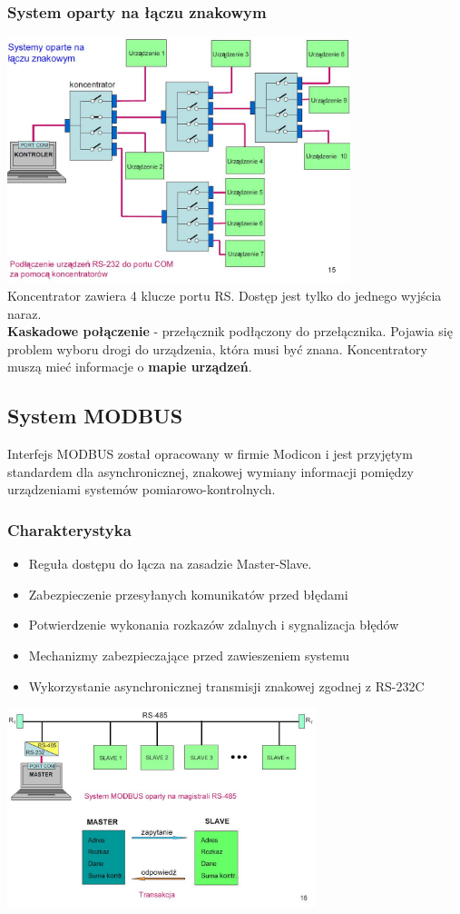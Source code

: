 		\subsubsection{System oparty na łączu znakowym}
		\includegraphics[width=10cm]{./wyklady/RS232_15_1.jpg}\\
		Koncentrator zawiera 4 klucze portu RS. Dostęp jest tylko do jednego wyjścia naraz.\\
		\textbf{Kaskadowe połączenie} - przełącznik podłączony do przełącznika. Pojawia się problem wyboru drogi do urządzenia, która musi być znana. Koncentratory muszą mieć informacje o \textbf{mapie urządzeń}.
	\subsection{System MODBUS}
		Interfejs MODBUS został opracowany w firmie Modicon i jest przyjętym standardem dla asynchronicznej, znakowej wymiany informacji pomiędzy urządzeniami systemów pomiarowo-kontrolnych.
		\subsubsection{Charakterystyka}
			\begin{itemize}
				\item Reguła dostępu do łącza na zasadzie Master-Slave. 
				\item Zabezpieczenie przesyłanych komunikatów przed błędami
				\item Potwierdzenie wykonania rozkazów zdalnych i sygnalizacja błędów
				\item Mechanizmy zabezpieczające przed zawieszeniem systemu
				\item Wykorzystanie asynchronicznej transmisji znakowej zgodnej z RS-232C
			\end{itemize}
		\includegraphics[width=9cm]{./wyklady/RS232_16_1.jpg}\\
